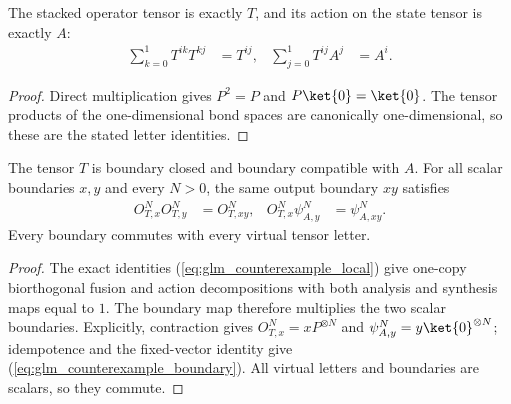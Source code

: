 \begin{lemma}
    \label{thm:glm_counterexample_local}
    \leanok
    The stacked operator tensor is exactly $T$, and its action on
    the state tensor is exactly $A$:
    \begin{align}
        \sum_{k=0}^1T^{ik}T^{kj} & =T^{ij}, &
        \sum_{j=0}^1T^{ij}A^j    & =A^i.
        \label{eq:glm_counterexample_local}
    \end{align}
\end{lemma}
\begin{proof}\leanok
    Direct multiplication gives $P^2=P$ and $P\ket{0}=\ket{0}$.
    The tensor products of the one-dimensional bond spaces are
    canonically one-dimensional, so these are the stated letter identities.
\end{proof}

\begin{lemma}
    \label{thm:glm_counterexample_closed}
    \leanok
    The tensor $T$ is boundary closed and boundary compatible with $A$.
    For all scalar boundaries $x,y$ and every $N>0$, the same output
    boundary $xy$ satisfies
    \begin{align}
        O^N_{T,x}O^N_{T,y}    & =O^N_{T,xy},    &
        O^N_{T,x}\psi^N_{A,y} & =\psi^N_{A,xy}.
        \label{eq:glm_counterexample_boundary}
    \end{align}
    Every boundary commutes with every virtual tensor letter.
\end{lemma}
\begin{proof}\leanok
    The exact identities (\ref{eq:glm_counterexample_local}) give
    one-copy biorthogonal fusion and action decompositions with both
    analysis and synthesis maps equal to $1$.
    The boundary map therefore multiplies the two scalar boundaries.
    Explicitly, contraction gives $O^N_{T,x}=xP^{\otimes N}$ and
    $\psi^N_{A,y}=y\ket{0}^{\otimes N}$; idempotence and the fixed-vector
    identity give (\ref{eq:glm_counterexample_boundary}).
    All virtual letters and boundaries are scalars, so they commute.
\end{proof}

